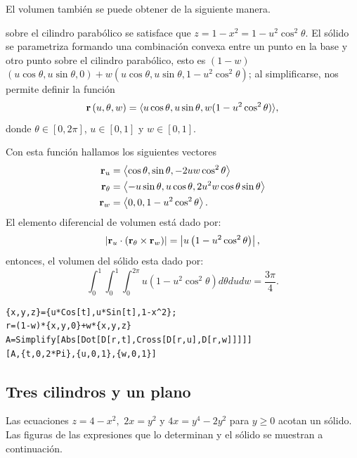El volumen también se puede obtener de la siguiente manera.

 sobre el cilindro parabólico se satisface que $z=1-x^2=1-u^2\cos ^2\theta $. El sólido se parametriza formando una combinación convexa entre un punto en la base y otro punto sobre el cilindro parabólico, esto es ${(1-w)}$ $(u\cos \theta ,u\sin \theta ,0) +w( u\cos \theta ,u\sin \theta ,1-u^2\cos ^2\theta)$; al simplificarse, nos permite definir la función
\[{\bf r}\left( u,\theta ,w\right) =\langle u\cos \theta , u\sin \theta ,w(1-u^2\cos ^2\theta )\rangle,\]
donde $\theta \in [0,2\pi]$, $u \in [0,1]$ y $w \in [0,1]$.

Con esta función hallamos los siguientes vectores
\begin{align*}
{\bf r}_{u} &= \left\langle \cos \theta,\sin \theta, -2uw\cos ^2\theta \right\rangle \\
{\bf r}_{\theta } &= \left\langle -u\sin \theta , u\cos \theta , 2u^2w\cos \theta \sin \theta \right\rangle \\
{\bf r}_{w} &= \left\langle 0 , 0 , 1-u^2\cos ^2\theta \right\rangle.
\end{align*}
El elemento diferencial de volumen está dado por:
\[\left\vert {\bf r}_{u}\cdot \left( {\bf r}_{\theta }\times {\bf r}_{w}\right) \right\vert =\left\vert u\left( 1-u^2\cos ^2\theta \right) \right\vert,\]
entonces, el volumen del sólido esta dado por:
\[\int_{0}^{1}\int_{0}^{1}\int_{0}^{2\pi }u\left( 1-u^2\cos ^2\theta \right) d\theta dudw= \frac{3\pi}{4}.\]

\begin{tcolorbox}[title=\bf Instrucción en \verb"Mathematica"]\begin{Verbatim}[formatcom=\letraverbatim]
{x,y,z}={u*Cos[t],u*Sin[t],1-x^2};
r=(1-w)*{x,y,0}+w*{x,y,z}
A=Simplify[Abs[Dot[D[r,t],Cross[D[r,u],D[r,w]]]]]
[A,{t,0,2*Pi},{u,0,1},{w,0,1}]
\end{Verbatim}
\end{tcolorbox}

\subsection{Tres cilindros y un plano}
Las ecuaciones $z=4-x^2,\,\, 2x=y^2$ y $4x=y^4-2y^2$ para $y \geq 0$ acotan un sólido.
Las figuras de las expresiones que lo determinan y el sólido se muestran a continuación.

